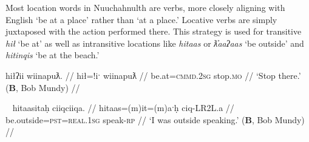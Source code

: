 \vspace{10pt}

Most location words in Nuuchahnulth are verbs, more closely aligning with English `be at a place' rather than `at a place.' Locative verbs are simply juxtaposed with the action performed there. This strategy is used for transitive \textit{hił} `be at' as well as intransitive locations like \textit{hitaas} or \textit{ƛ̓aaʔaas} `be outside' and \textit{hitinqis} `be at the beach.'

\ex \label{ex:stopthere}
\begingl
\glpreamble hiłʔii wiinapuƛ. //
\gla hił=!iˑ wiinapuƛ //
\glb be.at=\textsc{cmmd.2sg} stop.\textsc{mo} //
\glft `Stop there.' (\textbf{B}, Bob Mundy) //
\endgl
\xe

\begin{comment}
\ex \label{ex:workathome}
\begingl
\glpreamble hiłitin maḥt̓iiʔakqas mamuuk. //
\gla hił=(m)it=(m)in maḥt̓ii=ʔak=qaˑs mamuuk //
\glb be.at=\textsc{pst}=\textsc{strg.1pl} house=\textsc{poss}=\textsc{defn.1sg} work.\textsc{dr} //
\glft `We worked at my house.' (\textbf{T}, Fidelia Haiyupis) //
\endgl
\xe

\ex \label{ex:screamatbeach}
\begingl
\glpreamble n̓aʔiičiʔeƛ naʔuu łuucma ʕiikʕiika hitinqis. //
\gla n̓a-iˑčiƛ=!aƛ naʔuu łuucma ʕik-LR2L.a hitinqis //
\glb see-\textsc{in}=\textsc{now} be.with woman=\textsc{poss} scream-\textsc{rp} be.at.beach //
\glft `He heard a woman screaming on the beach.' (\textbf{C}, \textit{tupaat} Julia Lucas) //
\endgl
\xe
\end{comment}


\ex~ \label{ex:speakoutside}
\begingl
\glpreamble hitaasitaḥ ciiqciiqa. //
\gla hitaas=(m)it=(m)aˑḥ ciq-LR2L.a //
\glb be.outside=\textsc{pst}=\textsc{real.1sg} speak-\textsc{rp} //
\glft `I was outside speaking.' (\textbf{B}, Bob Mundy) //
\endgl
\xe

\begin{comment}
\ex~ \label{ex:speakoutside}
\begingl
\glpreamble qiiʔaƛintiis mamuuk ƛ̓aaʔaas. //
\gla qii=!aƛ=int=iis mamuuk ƛ̓aaʔaas //
\glb long.time=\textsc{now}=\textsc{pst}=\textsc{weak.1sg} work.\textsc{dr} be.outside //
\glft `I was working outside for a long time.' (\textbf{Q}, Sophie Billy) //
\endgl
\xe

\ex~ \label{ex:hideonroof}
\begingl
\glpreamble haptsaapaqƛiis suutił hiłaayiłkʷ. //
\gla hapt-saˑp=ʔaqƛ=iis sut-L.(č)ił hił-aˑyił=uk. //
\glb hide-\textsc{mo.caus}=\textsc{fut}=\textsc{weak.1sg} \textsc{2sg}-do.to be.at-on.a.roof=\textsc{poss} //
\glft `I will hide you on the roof.' (\textbf{Q}, Sophie Billy) //
\endgl
\xe
\end{comment}

